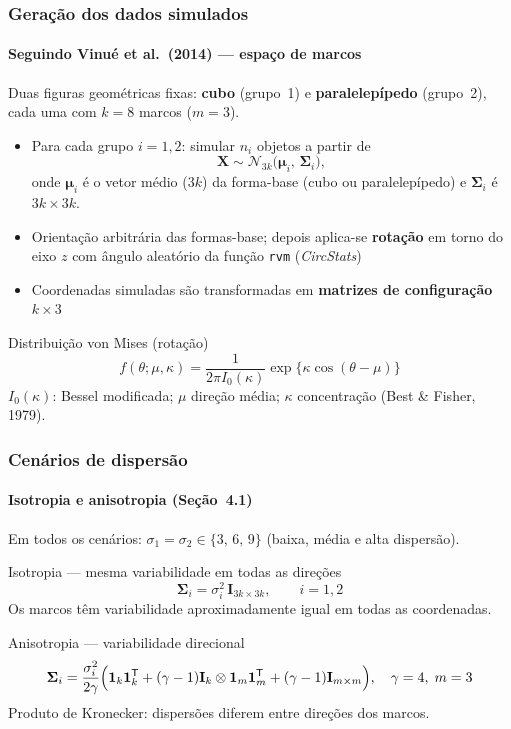 \documentclass[brazilian,11pt]{beamer}
\begin{document}
\begin{frame}[shrink=10]
    \frametitle{Geração dos dados simulados}
    \framesubtitle{Seguindo Vinué et al.\ (2014) --- espaço de marcos}

    \small
    Duas figuras geométricas fixas: \textbf{cubo} (grupo~1) e \textbf{paralelepípedo} (grupo~2), cada uma com $k=8$ marcos ($m=3$).

    \begin{itemize}
        \item Para cada grupo $i=1,2$: simular $n_i$ objetos a partir de
        \[
            \mathbf{X} \sim \mathcal{N}_{3k}\bigl(\boldsymbol{\mu}_i,\, \boldsymbol{\Sigma}_i\bigr),
        \]
        onde $\boldsymbol{\mu}_i$ é o vetor médio ($3k$) da forma-base (cubo ou paralelepípedo) e $\boldsymbol{\Sigma}_i$ é $3k \times 3k$.
        \item Orientação arbitrária das formas-base; depois aplica-se \textbf{rotação} em torno do eixo $z$ com ângulo aleatório da função \texttt{rvm} (\textit{CircStats})
        \item Coordenadas simuladas são transformadas em \textbf{matrizes de configuração} $k \times 3$
    \end{itemize}

    \begin{block}{Distribuição von Mises (rotação)}
        \[
            f(\theta;\mu,\kappa) = \frac{1}{2\pi I_0(\kappa)} \exp\{\kappa\cos(\theta-\mu)\}
        \]
        $I_0(\kappa)$: Bessel modificada; $\mu$ direção média; $\kappa$ concentração (Best \& Fisher, 1979).
    \end{block}
\end{frame}

\begin{frame}[shrink=12]
    \frametitle{Cenários de dispersão}
    \framesubtitle{Isotropia e anisotropia (Seção~4.1)}

    \small
    Em todos os cenários: $\sigma_1=\sigma_2 \in \{3,\,6,\,9\}$ (baixa, média e alta dispersão).

    \begin{block}{Isotropia --- mesma variabilidade em todas as direções}
        \[
            \boldsymbol{\Sigma}_i = \sigma_i^2 \, \mathbf{I}_{3k \times 3k}, \qquad i=1,2
        \]
        Os marcos têm variabilidade aproximadamente igual em todas as coordenadas.
    \end{block}

    \begin{block}{Anisotropia --- variabilidade direcional}
        \[
            \boldsymbol{\Sigma}_i = \frac{\sigma_i^2}{2\gamma}\Bigl(
            \mathbf{1}_k\mathbf{1}_k^{\mathsf T}
            + (\gamma-1)\mathbf{I}_k \otimes \mathbf{1}_m\mathbf{1}_m^{\mathsf T}
            + (\gamma-1)\mathbf{I}_{m \times m}\Bigr), \quad \gamma = 4,\; m=3
        \]
        Produto de Kronecker: dispersões diferem entre direções dos marcos.
    \end{block}
\end{frame}
\end{document}

